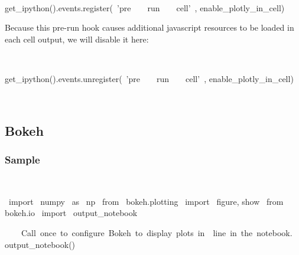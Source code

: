 \begin{paracol}{2}
\smallskip
\begin{cellExecute}[escapechar=~]
~~
\end{cellExecute}
\switchcolumn
\begin{codeCell}[escapechar=~]
get_ipython().events.register(~\textcolor{mtk25}{'pre}~~~~\textcolor{mtk25}{run}~~~~\textcolor{mtk25}{cell'}~, enable_plotly_in_cell)
\end{codeCell}
\end{paracol}
Because this pre-run hook causes additional javascript resources to be loaded in each cell output, we will disable it here:\\

\begin{paracol}{2}
\smallskip
\begin{cellExecute}[escapechar=~]
~~
\end{cellExecute}
\switchcolumn
\begin{codeCell}[escapechar=~]
get_ipython().events.unregister(~\textcolor{mtk25}{'pre}~~~~\textcolor{mtk25}{run}~~~~\textcolor{mtk25}{cell'}~, enable_plotly_in_cell)
\end{codeCell}
\end{paracol}

\begin{paracol}{2}
\begin{cellExecute}[escapechar=~]
~~
\end{cellExecute}
\switchcolumn
\begin{resultCell}[escapechar=~]
\end{resultCell}
\end{paracol}
\subsection{Bokeh}
\subsubsection{Sample}

\begin{paracol}{2}
\smallskip
\begin{cellExecute}[escapechar=~]
~~
\end{cellExecute}
\switchcolumn
\begin{codeCell}[escapechar=~]
~\textcolor{mtk17}{import}~ numpy ~\textcolor{mtk17}{as}~ np
~\textcolor{mtk17}{from}~ bokeh.plotting ~\textcolor{mtk17}{import}~ figure, show
~\textcolor{mtk17}{from}~ bokeh.io ~\textcolor{mtk17}{import}~ output_notebook

~~~\textcolor{mtk8}{ Call once to configure Bokeh to display plots in}~~\textcolor{mtk8}{line in the notebook.}~
output_notebook()
\end{codeCell}
\end{paracol}

